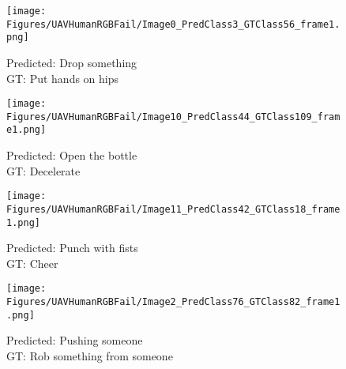 \documentclass[runningheads]{llncs}
\begin{document}
 
\begin{figure*}[t]
    \centering
\begin{subfigure}[b]{0.24\textwidth}
    \texttt{[image: Figures/UAVHumanRGBFail/Image0\_PredClass3\_GTClass56\_frame1.png]}
    \caption{Predicted: Drop something \\ GT: Put hands on hips}
    \end{subfigure}
    \begin{subfigure}[b]{0.24\textwidth}
    \texttt{[image: Figures/UAVHumanRGBFail/Image10\_PredClass44\_GTClass109\_frame1.png]}
    \caption{Predicted: Open the bottle \\ GT: Decelerate \\}
    \end{subfigure}
    \begin{subfigure}[b]{0.24\textwidth}
    \texttt{[image: Figures/UAVHumanRGBFail/Image11\_PredClass42\_GTClass18\_frame1.png]}
    \caption{Predicted: Punch with fists \\ GT: Cheer \\}
    \end{subfigure}
    \begin{subfigure}[b]{0.24\textwidth}
    \texttt{[image: Figures/UAVHumanRGBFail/Image2\_PredClass76\_GTClass82\_frame1.png]}
    \caption{Predicted: Pushing someone \\ GT: Rob something from someone}
    \end{subfigure}\\
    

\end{figure*}
\end{document}
